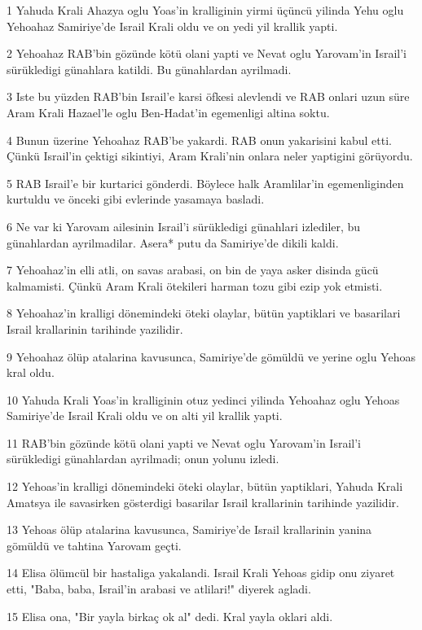 \par 1 Yahuda Krali Ahazya oglu Yoas'in kralliginin yirmi üçüncü yilinda Yehu oglu Yehoahaz Samiriye'de Israil Krali oldu ve on yedi yil krallik yapti.
\par 2 Yehoahaz RAB'bin gözünde kötü olani yapti ve Nevat oglu Yarovam'in Israil'i sürükledigi günahlara katildi. Bu günahlardan ayrilmadi.
\par 3 Iste bu yüzden RAB'bin Israil'e karsi öfkesi alevlendi ve RAB onlari uzun süre Aram Krali Hazael'le oglu Ben-Hadat'in egemenligi altina soktu.
\par 4 Bunun üzerine Yehoahaz RAB'be yakardi. RAB onun yakarisini kabul etti. Çünkü Israil'in çektigi sikintiyi, Aram Krali'nin onlara neler yaptigini görüyordu.
\par 5 RAB Israil'e bir kurtarici gönderdi. Böylece halk Aramlilar'in egemenliginden kurtuldu ve önceki gibi evlerinde yasamaya basladi.
\par 6 Ne var ki Yarovam ailesinin Israil'i sürükledigi günahlari izlediler, bu günahlardan ayrilmadilar. Asera* putu da Samiriye'de dikili kaldi.
\par 7 Yehoahaz'in elli atli, on savas arabasi, on bin de yaya asker disinda gücü kalmamisti. Çünkü Aram Krali ötekileri harman tozu gibi ezip yok etmisti.
\par 8 Yehoahaz'in kralligi dönemindeki öteki olaylar, bütün yaptiklari ve basarilari Israil krallarinin tarihinde yazilidir.
\par 9 Yehoahaz ölüp atalarina kavusunca, Samiriye'de gömüldü ve yerine oglu Yehoas kral oldu.
\par 10 Yahuda Krali Yoas'in kralliginin otuz yedinci yilinda Yehoahaz oglu Yehoas Samiriye'de Israil Krali oldu ve on alti yil krallik yapti.
\par 11 RAB'bin gözünde kötü olani yapti ve Nevat oglu Yarovam'in Israil'i sürükledigi günahlardan ayrilmadi; onun yolunu izledi.
\par 12 Yehoas'in kralligi dönemindeki öteki olaylar, bütün yaptiklari, Yahuda Krali Amatsya ile savasirken gösterdigi basarilar Israil krallarinin tarihinde yazilidir.
\par 13 Yehoas ölüp atalarina kavusunca, Samiriye'de Israil krallarinin yanina gömüldü ve tahtina Yarovam geçti.
\par 14 Elisa ölümcül bir hastaliga yakalandi. Israil Krali Yehoas gidip onu ziyaret etti, "Baba, baba, Israil'in arabasi ve atlilari!" diyerek agladi.
\par 15 Elisa ona, "Bir yayla birkaç ok al" dedi. Kral yayla oklari aldi.
